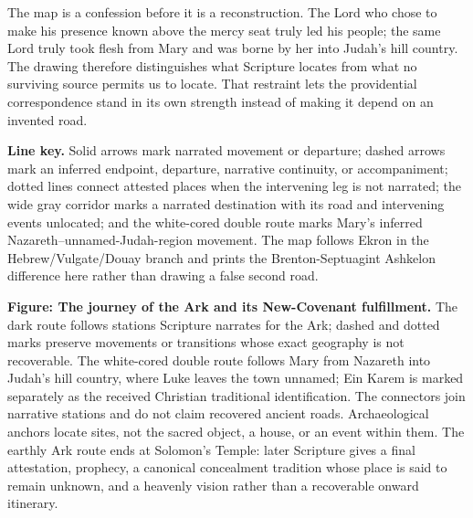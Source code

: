 The map is a confession before it is a reconstruction.  The Lord who chose to
make his presence known above the mercy seat truly led his people; the same
Lord truly took flesh from Mary and was borne by her into Judah's hill
country.  The drawing therefore distinguishes what Scripture locates from
what no surviving source permits us to locate.  That restraint lets the
providential correspondence stand in its own strength instead of making it
depend on an invented road.
\ifdefined\TriptychPrintEdition

\clearpage
\begin{center}
\ArkJourneyRegionalMap
\end{center}
\clearpage
\begin{center}
\ArkJourneyLevantMap
\end{center}
\else
\fi

\begingroup
\footnotesize
\textbf{Line key.}
Solid arrows mark narrated movement or departure; dashed arrows mark an
inferred endpoint, departure, narrative continuity, or accompaniment; dotted lines connect attested places when
the intervening leg is not narrated; the wide gray corridor marks a narrated
destination with its road and intervening events unlocated; and the white-cored
double route marks Mary's inferred Nazareth--unnamed-Judah-region movement.
The map follows Ekron in the Hebrew/Vulgate/Douay branch and prints the
Brenton-Septuagint Ashkelon difference here rather than drawing a false second
road.

\textbf{Figure: The journey of the Ark and its New-Covenant fulfillment.}
The dark route follows stations Scripture narrates for the Ark; dashed and
dotted marks preserve movements or transitions whose exact geography is not
recoverable.  The white-cored double route follows Mary from Nazareth into
Judah's hill country, where Luke leaves the town unnamed; Ein Karem is marked
separately as the received Christian traditional identification.  The
connectors join narrative stations and do not claim recovered ancient roads.
Archaeological anchors locate sites, not the sacred object, a house, or an
event within them.  The earthly Ark route ends at Solomon's Temple: later
Scripture gives a final attestation, prophecy, a canonical concealment
tradition whose place is said to remain unknown, and a heavenly vision rather
than a recoverable onward itinerary.
\endgroup

